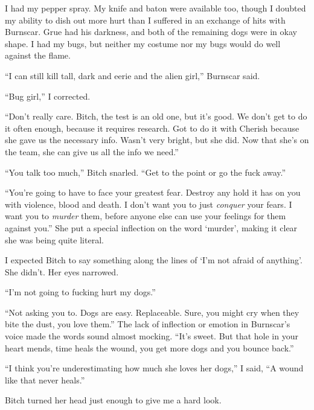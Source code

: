 I had my pepper spray.  My knife and baton were available too, though I doubted my ability to dish out more hurt than I suffered in an exchange of hits with Burnscar.  Grue had his darkness, and both of the remaining dogs were in okay shape.  I had my bugs, but neither my costume nor my bugs would do well against the flame.



``I can still kill tall, dark and eerie and the alien girl,'' Burnscar said.



``Bug girl,'' I corrected.



``Don't really care.  Bitch, the test is an old one, but it's good.  We don't get to do it often enough, because it requires research.  Got to do it with Cherish because she gave us the necessary info.  Wasn't very bright, but she did.  Now that she's on the team, she can give us all the info we need.''



``You talk too much,'' Bitch snarled.  ``Get to the point or go the fuck away.''



``You're going to have to face your greatest fear.  Destroy any hold it has on you with violence, blood and death.  I don't want you to just \emph{conquer} your fears.  I want you to \emph{murder} them, before anyone else can use your feelings for them against you.''  She put a special inflection on the word `murder', making it clear she was being quite literal.



I expected Bitch to say something along the lines of `I'm not afraid of anything'.  She didn't. Her eyes narrowed.



``I'm not going to fucking hurt my dogs.''



``Not asking you to.  Dogs are easy.  Replaceable.  Sure, you might cry when they bite the dust, you love them.''  The lack of inflection or emotion in Burnscar's voice made the words sound almost mocking.  ``It's sweet.  But that hole in your heart mends, time heals the wound, you get more dogs and you bounce back.''



``I think you're underestimating how much she loves her dogs,'' I said, ``A wound like that never heals.''



Bitch turned her head just enough to give me a hard look.



